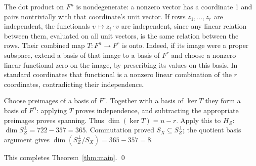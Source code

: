 \documentclass{article}
\begin{document}
The dot product on \(F^n\) is nondegenerate: a nonzero vector has a coordinate
1 and pairs nontrivially with that coordinate's unit vector. If rows
\(z_1, \dots, z_r\) are independent, the functionals \(v \mapsto z_i \cdot v\)
are independent, since any linear relation between them, evaluated on all unit
vectors, is the same relation between the rows. Their combined map
\(T \colon F^n \to F^r\) is onto. Indeed, if its image were a proper subspace,
extend a basis of that image to a basis of \(F^r\) and choose a nonzero linear
functional zero on the image, by prescribing its values on this basis. In
standard coordinates that functional is a nonzero linear combination of the
\(r\) coordinates, contradicting their independence.

Choose preimages of a basis of \(F^r\). Together with a basis of \(\ker T\)
they form a basis of \(F^n\): applying \(T\) proves independence, and
subtracting the appropriate preimages proves spanning. Thus
\(\dim(\ker T) = n - r\). Apply this to \(H_Z\):
\(\dim S_Z^{\perp} = 722 - 357 = 365\). Commutation proved
\(S_X \subseteq S_Z^{\perp}\); the quotient basis argument gives
\(\dim(S_Z^{\perp}/S_X) = 365 - 357 = 8\).

This completes Theorem~\ref{thm:main}. \qed
\end{document}
